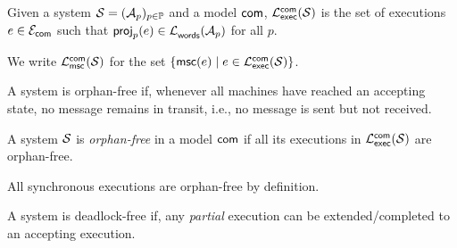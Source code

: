 

\begin{definition}
\label{def:executions-of-cfsms}
Given a system $\cfsms=(\acfsm_p)_{p\in\Procs}$ and a 
model $\acommunicationmodel$,  
$\executionsofcfsms{\cfsms}{\acommunicationmodel}$ is the set of 
executions $e \in \executionsofmodel{\acommunicationmodel}$ such that  
$\projofon{e}{p}\in\languageofnfa{\acfsm_p}$ for all $p$.  
\end{definition}


We write $\mscsofcfsms{\cfsms}{\acommunicationmodel}$ for the set 
$\{\mscof{e} \mid e\in\executionsofcfsms{\cfsms}{\acommunicationmodel}\}$.

A system is orphan-free if, whenever all machines have reached 
an accepting state, no message
remains in transit, i.e., no message is sent but not received.

\bigskip

\begin{definition}\label{def:orphan-free}
A system $\cfsms$ is \emph{orphan-free} in a model $\acommunicationmodel$  
if all its executions in $\executionsofcfsms{\cfsms}{\acommunicationmodel}$  
are orphan-free.  
\end{definition}

All synchronous executions are orphan-free by definition.

A system is deadlock-free if, 
any \emph{partial} execution can be extended/completed to an accepting execution.

